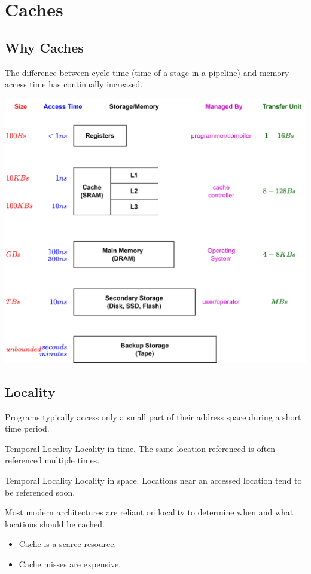 \chapter{Caches}
\section{Why Caches}
The difference between cycle time (time of a stage in a pipeline) and memory access time has continually increased.
\begin{center}
    \includegraphics[width=.9\textwidth]{caches/images/memory_hierarchy.drawio.png}
\end{center}
\section{Locality}
Programs typically access only a small part of their address space during a short time period.
\begin{tcbraster}[raster columns=2,raster equal height]
    \begin{definitionbox}{Temporal Locality}
        Locality in time. The same location referenced is often referenced multiple times.
    \end{definitionbox}
    \begin{definitionbox}{Temporal Locality}
        Locality in space. Locations near an accessed location tend to be referenced soon.
    \end{definitionbox}
\end{tcbraster}
Most modern architectures are reliant on locality to determine when and what locations should be cached.
\begin{itemize}
    \item Cache is a scarce resource.
    \item Cache misses are expensive.
\end{itemize}

